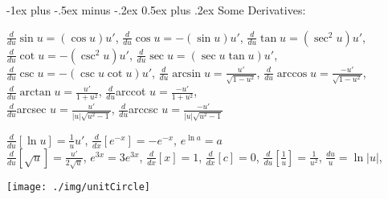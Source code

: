 \documentclass[10pt,landscape]{article}
\makeatletter
\renewcommand{\section}{\@startsection{section}{1}{0mm}%
                                {-1ex plus -.5ex minus -.2ex}%
                                {0.5ex plus .2ex}%
                                {\normalfont\large\bfseries}}
\makeatother
\begin{document}
\begin{multicols}{3}
\section{Some Derivatives:}

$\frac{d}{du} \sin u = (\cos u)u'$, $\frac{d}{du} \cos u = -(\sin u)u'$, $\frac{d}{du} \tan u = (\sec^2 u)u'$,
$\frac{d}{du} \cot u = -(\csc^2 u)u'$, $\frac{d}{du} \sec u = (\sec u \tan u)u'$, $\frac{d}{du} \csc u = -(\csc u \cot u)u'$,
$\frac{d}{du} \arcsin u = \frac{u'}{\sqrt{1 - u^2}}$, $\frac{d}{du} \arccos u = \frac{-u'}{\sqrt{1 - u^2}}$,
$\frac{d}{du} \arctan u = \frac{u'}{1 + u^2}$, $\frac{d}{du} $arccot $ u = \frac{-u'}{1 + u^2}$, \\
$\frac{d}{du} $arcsec $ u = \frac{u'}{|u|\sqrt{u^2 - 1}}$,
$\frac{d}{du} $arccsc $ u = \frac{-u'}{|u|\sqrt{u^2 - 1}}$

$\frac{d}{du}[\ln{u}] = \frac{1}{u}u'$, $\frac{d}{dx}[e^{-x}] = -e^{-x}$, $e^{\ln a} = a$ \\
$\frac{d}{du}[\sqrt{u}] = \frac{u'}{2 \sqrt{u}}$, $e^{3x} = 3e^{3x}$, $\frac{d}{dx}\left[ x \right] = 1$, $\frac{d}{dx}\left[ c \right] = 0$, 
$\frac{d}{du}[ \frac{1}{u} ] = \frac{1}{u^2}$, $\frac{du}{u} = \ln |u|$,


\texttt{[image: ./img/unitCircle]}






\end{multicols}
\end{document}
